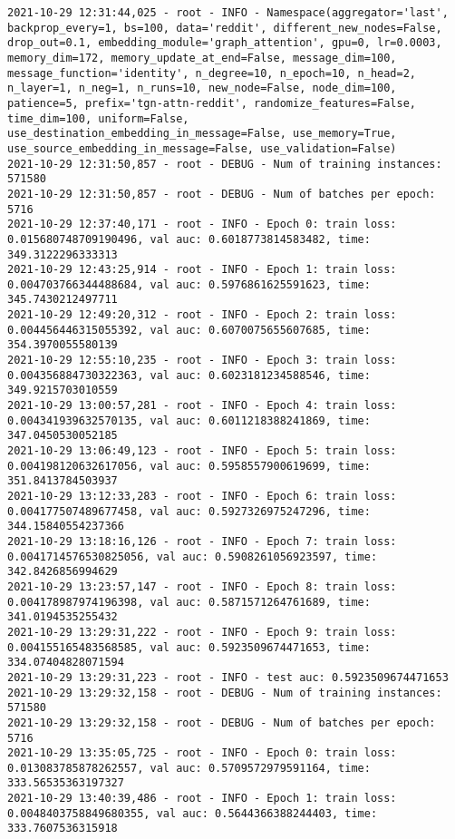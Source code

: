 \documentclass[11pt]{article}
\begin{document}
\begin{verbatim}
2021-10-29 12:31:44,025 - root - INFO - Namespace(aggregator='last', backprop_every=1, bs=100, data='reddit', different_new_nodes=False, drop_out=0.1, embedding_module='graph_attention', gpu=0, lr=0.0003, memory_dim=172, memory_update_at_end=False, message_dim=100, message_function='identity', n_degree=10, n_epoch=10, n_head=2, n_layer=1, n_neg=1, n_runs=10, new_node=False, node_dim=100, patience=5, prefix='tgn-attn-reddit', randomize_features=False, time_dim=100, uniform=False, use_destination_embedding_in_message=False, use_memory=True, use_source_embedding_in_message=False, use_validation=False)
2021-10-29 12:31:50,857 - root - DEBUG - Num of training instances: 571580
2021-10-29 12:31:50,857 - root - DEBUG - Num of batches per epoch: 5716
2021-10-29 12:37:40,171 - root - INFO - Epoch 0: train loss: 0.015680748709190496, val auc: 0.6018773814583482, time: 349.3122296333313
2021-10-29 12:43:25,914 - root - INFO - Epoch 1: train loss: 0.004703766344488684, val auc: 0.5976861625591623, time: 345.7430212497711
2021-10-29 12:49:20,312 - root - INFO - Epoch 2: train loss: 0.004456446315055392, val auc: 0.6070075655607685, time: 354.3970055580139
2021-10-29 12:55:10,235 - root - INFO - Epoch 3: train loss: 0.004356884730322363, val auc: 0.6023181234588546, time: 349.9215703010559
2021-10-29 13:00:57,281 - root - INFO - Epoch 4: train loss: 0.004341939632570135, val auc: 0.6011218388241869, time: 347.0450530052185
2021-10-29 13:06:49,123 - root - INFO - Epoch 5: train loss: 0.004198120632617056, val auc: 0.5958557900619699, time: 351.8413784503937
2021-10-29 13:12:33,283 - root - INFO - Epoch 6: train loss: 0.004177507489677458, val auc: 0.5927326975247296, time: 344.15840554237366
2021-10-29 13:18:16,126 - root - INFO - Epoch 7: train loss: 0.0041714576530825056, val auc: 0.5908261056923597, time: 342.8426856994629
2021-10-29 13:23:57,147 - root - INFO - Epoch 8: train loss: 0.004178987974196398, val auc: 0.5871571264761689, time: 341.0194535255432
2021-10-29 13:29:31,222 - root - INFO - Epoch 9: train loss: 0.004155165483568585, val auc: 0.5923509674471653, time: 334.07404828071594
2021-10-29 13:29:31,223 - root - INFO - test auc: 0.5923509674471653
2021-10-29 13:29:32,158 - root - DEBUG - Num of training instances: 571580
2021-10-29 13:29:32,158 - root - DEBUG - Num of batches per epoch: 5716
2021-10-29 13:35:05,725 - root - INFO - Epoch 0: train loss: 0.013083785878262557, val auc: 0.5709572979591164, time: 333.56535363197327
2021-10-29 13:40:39,486 - root - INFO - Epoch 1: train loss: 0.0048403758849680355, val auc: 0.5644366388244403, time: 333.7607536315918

\end{verbatim}
\end{document}
